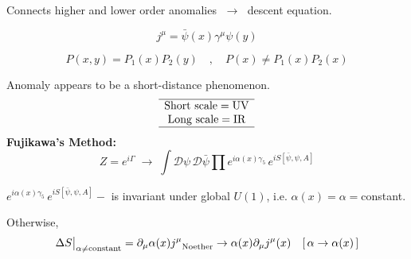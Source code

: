 \documentclass[14pt]{article} %
\begin{document}
Connects higher and lower order anomalies $\;\rightarrow\;$ descent equation.

\[
j^\mu = \bar{\psi}(x)\gamma^\mu\psi(y)
\]

\[
P(x,y) = P_1(x)P_2(y) \quad,\quad
P(x) \neq P_1(x)P_2(x)
\]

Anomaly appears to be a short-distance phenomenon.
\[
\begin{array}{cc}
\hline
\text{Short scale} = \text{UV}
\\
\text{Long scale} = \text{IR} \\
\hline
\end{array}
\]
\textbf{Fujikawa's Method:} \\
\[
Z = e^{i\Gamma}
\;\longrightarrow\;
\int \mathcal{D}\psi\,\mathcal{D}\bar{\psi}
\prod e^{i\alpha(x)\gamma_5}
\, e^{iS[\bar{\psi},\psi,A]}
\]

$e^{i\alpha(x)\gamma_5}
\, e^{iS[\bar{\psi},\psi,A]}-$ is invariant under global $U(1)$, i.e. $\alpha(x) = \alpha =$constant.

Otherwise,
\begin{align*}
\Delta S\big|_{\alpha \neq \text{constant}} 
=
\partial_\mu \alpha(x) {j^\mu}_{\small \text{Noether}} \to \alpha(x) \partial_\mu j^\mu (x) \quad [\,\alpha \to \alpha(x)\,]
\end{align*}
\end{document}
